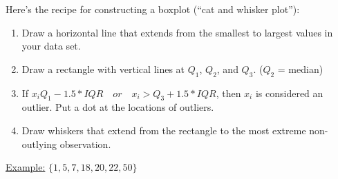 \documentclass[../Notes.tex]{subfiles}
\begin{document}
    \begin{multicols}{2}
        Here's the recipe for constructing a boxplot (``cat and whisker plot''):

        \begin{enumerate}
            \item Draw a horizontal line that extends from the smallest to largest values in your data set.
            \item Draw a rectangle with vertical lines at $Q_1$, $Q_2$, and $Q_3$. ($Q_2$ = median)
            \item If $x_i Q_1 - 1.5 * IQR \quad or \quad x_i > Q_3 + 1.5 * IQR$, then $x_i$ is considered an outlier. Put a dot at the locations of outliers.
            \item Draw whiskers that extend from the rectangle to the most extreme non-outlying observation.
        \end{enumerate}

        \columnbreak

        \underline{Example:} $\{1,5,7,18,20,22,50\}$

    \end{multicols}
\end{document}

